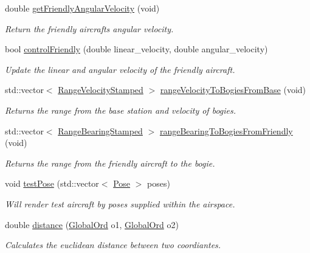 \begin{DoxyCompactItemize}
double \hyperlink{classSimulator_a054241a50cbf232b71acdaf4290855d3}{get\+Friendly\+Angular\+Velocity} (void)
\begin{DoxyCompactList}\small\item\em Return the friendly aircraft\textquotesingle{}s angular velocity. \end{DoxyCompactList}\item 
bool \hyperlink{classSimulator_adb1cff57466c3b03fd738036cb9cee63}{control\+Friendly} (double linear\+\_\+velocity, double angular\+\_\+velocity)
\begin{DoxyCompactList}\small\item\em Update the linear and angular velocity of the friendly aircraft. \end{DoxyCompactList}\item 
std\+::vector$<$ \hyperlink{structRangeVelocityStamped}{Range\+Velocity\+Stamped} $>$ \hyperlink{classSimulator_ae286a7571719440cc06b2441900efb44}{range\+Velocity\+To\+Bogies\+From\+Base} (void)
\begin{DoxyCompactList}\small\item\em Returns the range from the base station and velocity of bogies. \end{DoxyCompactList}\item 
std\+::vector$<$ \hyperlink{structRangeBearingStamped}{Range\+Bearing\+Stamped} $>$ \hyperlink{classSimulator_af78c417dd541bf1f671894f49739106f}{range\+Bearing\+To\+Bogies\+From\+Friendly} (void)
\begin{DoxyCompactList}\small\item\em Returns the range from the friendly aircraft to the bogie. \end{DoxyCompactList}\item 
void \hyperlink{classSimulator_aedf306bfd80a13ff07d9197bd5703805}{test\+Pose} (std\+::vector$<$ \hyperlink{structPose}{Pose} $>$ poses)
\begin{DoxyCompactList}\small\item\em Will render test aircraft by poses supplied within the airspace. \end{DoxyCompactList}\item 
double \hyperlink{classSimulator_ab21eff1f7776080c591765f099c2fb7e}{distance} (\hyperlink{structGlobalOrd}{Global\+Ord} o1, \hyperlink{structGlobalOrd}{Global\+Ord} o2)
\begin{DoxyCompactList}\small\item\em Calculates the euclidean distance between two coordiantes. \end{DoxyCompactList}\end{DoxyCompactItemize}
